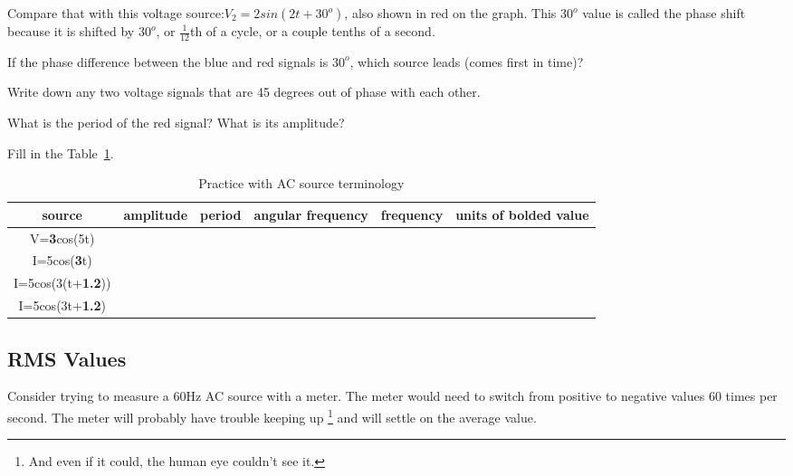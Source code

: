 Compare that with this voltage source:$V_2=2sin(2t+30^o)$, also shown in red on the graph. This $30^o$ value is called the phase shift because it is shifted by $30^o$, or $\frac{1}{12}$th of a cycle, or a couple tenths of a second.

\begin{alevel}
If the phase difference between the blue and red signals is $30^o$, which source leads (comes first in time)?
\end{alevel}

\begin{alevel}
Write down any two voltage signals that are 45 degrees out of phase with each other.
\end{alevel}

\begin{alevel}
What is the period of the red signal? What is its amplitude?
\end{alevel}

\begin{blevel}
Fill in the Table~\ref{T:AC1}.
\end{blevel}

\begin{table}[H]
\begin{center}
\begin{tabular}{|c|c|c|c|c|c|} \hline
source&amplitude	&period	&angular frequency	&frequency &units of bolded value \\ \hline
V=\textbf{3}cos(5t)&		&&&& \\ \hline
I=5cos(\textbf{3}t)&		&&&& \\ \hline
I=5cos(3(t+\textbf{1.2}))&		&&&& \\ \hline
I=5cos(3t+\textbf{1.2})&		&&&& \\ \hline
\end{tabular}
\caption{Practice with AC source terminology}
\label{T:AC1}
\end{center}
\end{table}



\subsection{RMS Values}
Consider trying to measure a 60Hz AC source with a meter. The meter would need to switch from positive to negative values 60 times per second.  The meter will probably have trouble keeping up \footnote{And even if it could, the human eye couldn't see it.} and will settle on the average value.

